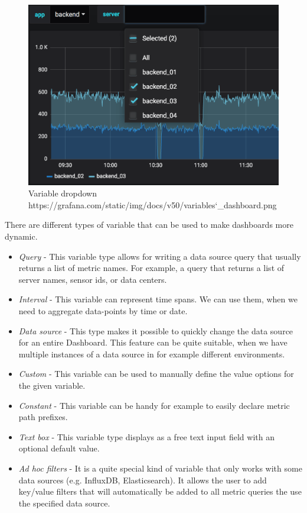 \begin{figure}[H]
	\centering
	\includegraphics[width=130mm, keepaspectratio]{figures/variable-dropdown.png}
	\caption{Variable dropdown https://grafana.com/static/img/docs/v50/variables\char`_dashboard.png}
	\label{fig:variable-dropdown}
\end{figure}


There are different types of variable that can be used to make dashboards more dynamic.
\begin{itemize}
	\item \emph{Query} - This variable type allows for writing a data source query that usually returns a list of metric names. For example, a query that returns a list of server names, sensor ids, or data centers.
	\item \emph{Interval} - This variable can represent time spans. We can use them, when we need to aggregate data-points by time or date.
	\item \emph{Data source} - This type makes it possible to quickly change the data source for an entire Dashboard. This feature can be quite suitable, when we have multiple instances of a data source in for example different environments.
	\item \emph{Custom} - This variable can be used to manually define the value options for the given variable.
	\item \emph{Constant} - This variable can be handy for example to easily declare metric path prefixes. 
	\item \emph{Text box} - This variable type displays as a free text input field with an optional default value.
	\item \emph{Ad hoc filters} - It is a quite special kind of variable that only works with some data sources (e.g. InfluxDB, Elasticsearch). It allows the user to add key/value filters that will automatically be added to all metric queries the use the specified data source.
\end{itemize}

